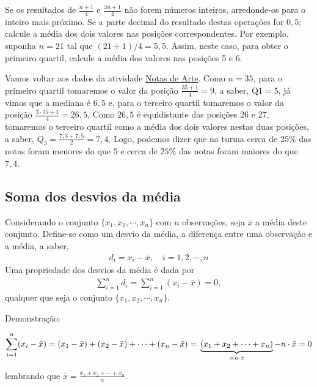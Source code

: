 {{{Se os resultados de  \(\frac{n+1}{4}\) e \(\frac{3n+1}{4}\) não forem números inteiros, arredonde-os para o inteiro mais próximo. Se a parte decimal do resultado destas operações for $0{,}5$; calcule a média dos dois valores nas posições correspondentes. Por exemplo, suponha \(n=21\) tal que \((21+1)/4=5,5\). Assim, neste caso, para obter o primeiro quartil, calcule a média dos valores nas posições 5 e 6.

Vamos voltar aos dados da atividade \hyperref[\detokenize{PE104-0:ativ-notas-de-artes}]{Notas de Arte}. Como \(n=35\), para o primeiro quartil tomaremos o valor da posição \(\frac{35+1}{4}=9\), a saber, \(\text{Q}1=5\), já vimos que a mediana é $6{,}5$ e, para o terceiro quartil tomaremos o valor da posição \(\frac{3\cdot 35+1}{4}=26{,}5\). Como $26{,}5$ é equidistante das posições 26 e 27, tomaremos o terceiro quartil como a média dos dois valores nestas duas posições, a saber, \(Q_3=\frac{7,3+7,5}{2}=7,4\). Logo, podemos dizer que na turma cerca de $25\%$ das notas foram menores do que $5$ e cerca de $25\%$ das notas foram maiores do que $7{,}4$.

\subsection{Soma dos desvios da média}

Considerando o conjunto \(\{ x_1,x_2,\cdots, x_n\}\) com \(n\) observações, seja \(\bar{x}\) a média deste conjunto.  Define-se como um desvio da média, a diferença entre uma observação e a média, a saber,
\begin{equation*}
\begin{split}d_i=x_i-\bar{x}, \quad i=1,2,\cdots, n\end{split}
\end{equation*}
Uma propriedade dos desvios da média é dada por
\begin{equation*}
\begin{split}\sum^n_{i=1}d_i=\sum^n_{i=1}(x_i-\bar{x})=0,\end{split}
\end{equation*}
qualquer que seja o conjunto \(\{ x_1,x_2,\cdots, x_n\}\).

Demonstração:

$$\displaystyle{\sum^n_{i=1}} (x_i-\bar{x})=(x_1-\bar{x})+(x_2-\bar{x})+\cdots+(x_n-\bar{x})=\\ \underbrace{(x_1+x_2+\cdots +x_n)}_{=n\cdot \bar{x}} - n\cdot \bar{x}=0$$

lembrando que \(\displaystyle\bar{x}=\frac{x_1+x_2+\cdots+x_n}{n}\).

}}}
